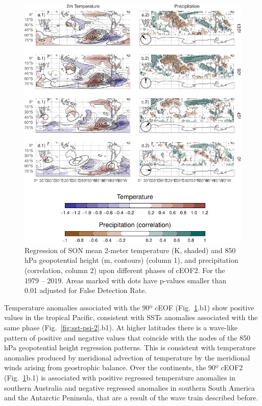 \documentclass[pdflatex,lineno,sn-basic]{sn-jnl}
\theoremstyle{thmstyleone}%
\theoremstyle{thmstyletwo}%
\theoremstyle{thmstylethree}%
\begin{document}
\begin{figure}
\centering
\includegraphics{shceof_files/figure-latex/pp-temp-2-1.pdf}
\caption{\label{fig:pp-temp-2}Regression of SON mean 2-meter temperature (K, shaded) and 850 hPa geopotential height (m, contours) (column 1), and precipitation (correlation, column 2) upon different phases of cEOF2. For the 1979 -- 2019. Areas marked with dots have p-values smaller than 0.01 adjusted for False Detection Rate.}
\end{figure}

Temperature anomalies associated with the 90º cEOF (Fig.~\ref{fig:pp-temp-2}.b1) show positive values in the tropical Pacific, consistent with SSTs anomalies associated with the same phase (Fig.~\ref{fig:sst-psi-2}.b1).
At higher latitudes there is a wave-like pattern of positive and negative values that coincide with the nodes of the 850 hPa geopotential height regression patterns.
This is consistent with temperature anomalies produced by meridional advection of temperature by the meridional winds arising from geostrophic balance.
Over the continents, the 90º cEOF2 (Fig.~\ref{fig:pp-temp-2}b.1) is associated with positive regressed temperature anomalies in southern Australia and negative regressed anomalies in southern South America and the Antarctic Peninsula, that are a result of the wave train described before.
\end{document}
